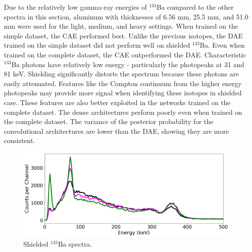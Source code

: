 Due to the relatively low gamma-ray energies of $^{133}$Ba compared to the other spectra in this section, aluminum with thicknesses of 6.56 mm, 25.5 mm, and 51.0 mm were used for the light, medium, and heavy settings. When trained on the simple dataset, the CAE performed best. Unlike the previous isotopes, the DAE trained on the simple dataset did not perform well on shielded $^{133}$Ba. Even when trained on the complete dataset, the CAE outperformed the DAE. Characteristic $^{133}$Ba photons have relatively low energy - particularly the photopeaks at 31 and 81 keV. Shielding significantly distorts the spectrum because these photons are easily attenuated. Features like the Compton continuum from the higher energy photopeaks may provide more signal when identifying these isotopes in shielded case. These features are also better exploited in the networks trained on the complete dataset. The dense architectures perform poorly even when trained on the complete dataset. The variance of the posterior probability for the convolutional architectures are lower than the DAE, showing they are more consistent.


\begin{figure}[H]
	\centering
	\includegraphics[width=1.0\linewidth]{images/shielded_ba133}
	\caption{Shielded $^{133}$Ba spectra.}
	\label{fig:shielded_ba133}
\end{figure}

